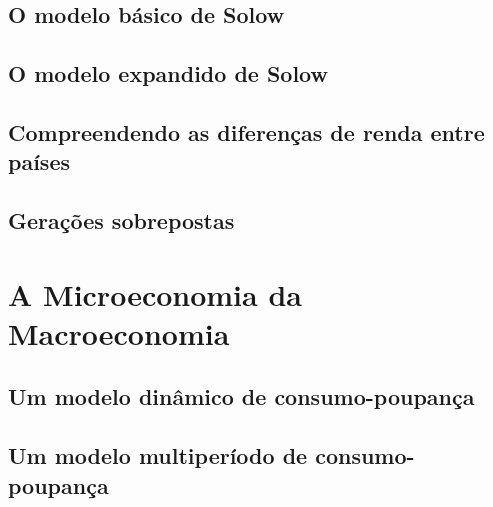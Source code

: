 \documentclass[a4paper,11pt]{book}
\theoremstyle{definition}
\begin{document}
\chapter{O modelo básico de Solow}

\chapter{O modelo expandido de Solow}

\chapter{Compreendendo as diferenças de renda entre países}

\chapter{Gerações sobrepostas}

\part{A Microeconomia da Macroeconomia}

\chapter{Um modelo dinâmico de consumo-poupança}

\chapter{Um modelo multiperíodo de consumo-poupança}
\end{document}
